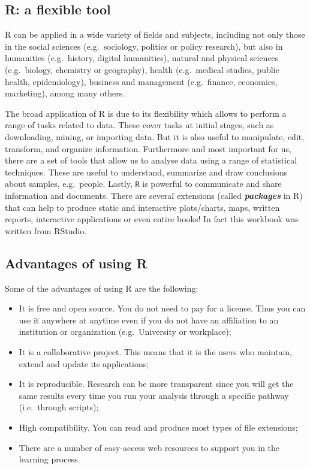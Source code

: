 \documentclass[
]{book}
\providecommand{\tightlist}{%
  \setlength{\itemsep}{0pt}\setlength{\parskip}{0pt}}
\begin{document}
\hypertarget{r-a-flexible-tool}{%
\subsection{R: a flexible tool}\label{r-a-flexible-tool}}

R can be applied in a wide variety of fields and subjects, including not only those in the social sciences (e.g.~sociology, politics or policy research), but also in humanities (e.g.~history, digital humanities), natural and physical sciences (e.g.~biology, chemistry or geography), health (e.g.~medical studies, public health, epidemiology), business and management (e.g.~finance, economics, marketing), among many others.

The broad application of R is due to its flexibility which allows to perform a range of tasks related to data. These cover tasks at initial stages, such as downloading, mining, or importing data. But it is also useful to manipulate, edit, transform, and organize information. Furthermore and most important for us, there are a set of tools that allow us to analyse data using a range of statistical techniques. These are useful to understand, summarize and draw conclusions about samples, e.g.~people. Lastly, \texttt{R} is powerful to communicate and share information and documents. There are several extensions (called \emph{\textbf{packages}} in R) that can help to produce static and interactive plots/charts, maps, written reports, interactive applications or even entire books! In fact this workbook was written from RStudio.

\hypertarget{advantages-of-using-r}{%
\subsection{Advantages of using R}\label{advantages-of-using-r}}

Some of the advantages of using R are the following:

\begin{itemize}
\tightlist
\item
  It is free and open source. You do not need to pay for a license. Thus you can use it anywhere at anytime even if you do not have an affiliation to an institution or organization (e.g.~University or workplace);
\item
  It is a collaborative project. This means that it is the users who maintain, extend and update its applications;
\item
  It is reproducible. Research can be more transparent since you will get the same results every time you run your analysis through a specific pathway (i.e.~through scripts);
\item
  High compatibility. You can read and produce most types of file extensions;
\item
  There are a number of easy-access web resources to support you in the learning process.
\end{itemize}
\end{document}
